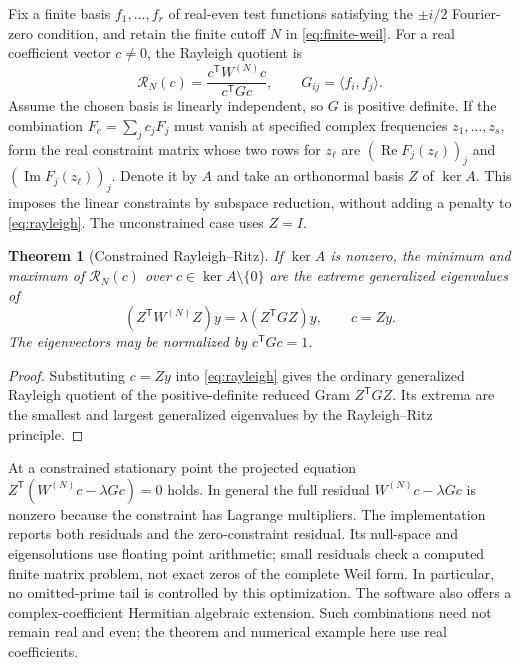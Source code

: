\documentclass[11pt]{article}
\newtheorem{theorem}{Theorem}
\begin{document}
Fix a finite basis $f_1,\ldots,f_r$ of real-even test functions satisfying
the $\pm i/2$ Fourier-zero condition, and retain the finite cutoff $N$ in
\eqref{eq:finite-weil}. For a real coefficient vector $c\ne0$, the
Rayleigh quotient is
\begin{equation}\label{eq:rayleigh}
  \mathcal R_N(c)=\frac{c^{\mathsf T}W^{(N)}c}{c^{\mathsf T}Gc},
  \qquad G_{ij}=\langle f_i,f_j\rangle.
\end{equation}
Assume the chosen basis is linearly independent, so $G$ is positive
definite. If the combination $F_c=\sum_jc_jF_j$ must vanish at specified
complex frequencies $z_1,\ldots,z_s$, form the real constraint matrix
whose two rows for $z_\ell$ are
$(\operatorname{Re}F_j(z_\ell))_j$ and
$(\operatorname{Im}F_j(z_\ell))_j$. Denote it by $A$ and take an
orthonormal basis $Z$ of $\ker A$. This imposes the linear constraints by
subspace reduction, without adding a penalty to \eqref{eq:rayleigh}.
The unconstrained case uses $Z=I$.

\begin{theorem}[Constrained Rayleigh--Ritz]\label{thm:ritz}
If $\ker A$ is nonzero, the minimum and maximum of
$\mathcal R_N(c)$ over $c\in\ker A\setminus\{0\}$ are the extreme
generalized eigenvalues of
\begin{equation}\label{eq:reduced-pencil}
  (Z^{\mathsf T}W^{(N)}Z)y
  =\lambda(Z^{\mathsf T}GZ)y,\qquad c=Zy.
\end{equation}
The eigenvectors may be normalized by $c^{\mathsf T}Gc=1$.
\end{theorem}
\begin{proof}
Substituting $c=Zy$ into \eqref{eq:rayleigh} gives the ordinary
generalized Rayleigh quotient of the positive-definite reduced Gram
$Z^{\mathsf T}GZ$. Its extrema are the smallest and largest generalized
eigenvalues by the Rayleigh--Ritz principle.
\end{proof}

At a constrained stationary point the projected equation
$Z^{\mathsf T}(W^{(N)}c-\lambda Gc)=0$ holds. In general the full
residual $W^{(N)}c-\lambda Gc$ is nonzero because the constraint has
Lagrange multipliers. The implementation reports both residuals and the
zero-constraint residual. Its null-space and eigensolutions use floating
point arithmetic; small residuals check a computed finite matrix problem,
not exact zeros of the complete Weil form. In particular, no omitted-prime
tail is controlled by this optimization.
The software also offers a complex-coefficient Hermitian algebraic
extension. Such combinations need not remain real and even; the theorem
and numerical example here use real coefficients.
\end{document}
